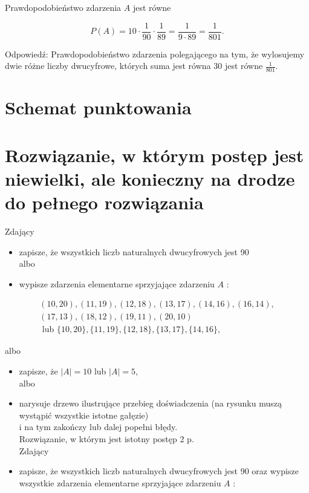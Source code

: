 \documentclass[10pt]{article}
\begin{document}
Prawdopodobieństwo zdarzenia $A$ jest równe

$$
P(A)=10 \cdot \frac{1}{90} \cdot \frac{1}{89}=\frac{1}{9 \cdot 89}=\frac{1}{801} .
$$

Odpowiedź: Prawdopodobieństwo zdarzenia polegającego na tym, że wylosujemy dwie różne liczby dwucyfrowe, których suma jest równa 30 jest równe $\frac{1}{801}$.

\section*{Schemat punktowania}
\section*{Rozwiązanie, w którym postęp jest niewielki, ale konieczny na drodze do pełnego rozwiązania}
Zdający

\begin{itemize}
  \item zapisze, że wszystkich liczb naturalnych dwucyfrowych jest 90\\
albo
  \item wypisze zdarzenia elementarne sprzyjające zdarzeniu $A$ :
\end{itemize}

$$
\begin{gathered}
(10,20),(11,19),(12,18),(13,17),(14,16),(16,14), \\
(17,13),(18,12),(19,11),(20,10) \\
\text { lub }\{10,20\},\{11,19\},\{12,18\},\{13,17\},\{14,16\},
\end{gathered}
$$

albo

\begin{itemize}
  \item zapisze, że $|A|=10$ lub $|A|=5$,\\
albo
  \item narysuje drzewo ilustrujące przebieg doświadczenia (na rysunku muszą wystąpić wszystkie istotne gałęzie)\\
i na tym zakończy lub dalej popełni błędy.\\
Rozwiązanie, w którym jest istotny postęp 2 p.\\
Zdający
  \item zapisze, że wszystkich liczb naturalnych dwucyfrowych jest 90 oraz wypisze wszystkie zdarzenia elementarne sprzyjające zdarzeniu $A$ :
\end{itemize}
\end{document}
